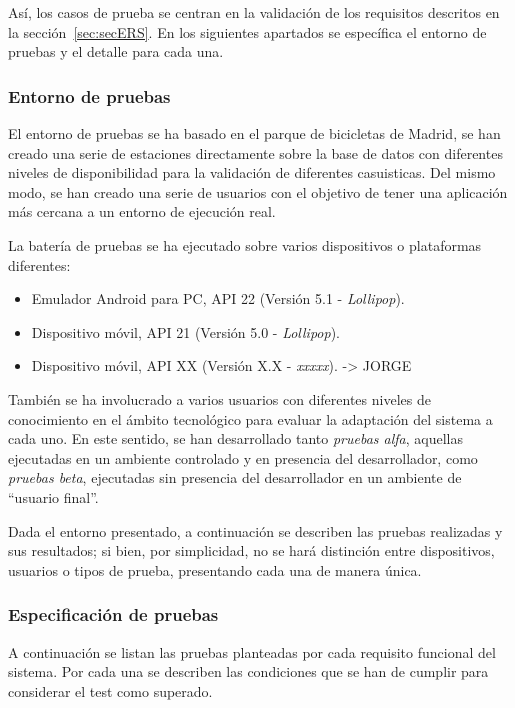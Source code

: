 Así, los casos de prueba se centran en la validación de los requisitos descritos en la sección~\ref{sec:secERS}. En los siguientes apartados se específica el entorno de pruebas y el detalle para cada una.

\subsubsection{Entorno de pruebas}

El entorno de pruebas se ha basado en el parque de bicicletas de Madrid, se han creado una serie de estaciones directamente sobre la base de datos con diferentes niveles de disponibilidad para la validación de diferentes casuisticas. Del mismo modo, se han creado una serie de usuarios con el objetivo de tener una aplicación más cercana a un entorno de ejecución real.

La batería de pruebas se ha ejecutado sobre varios dispositivos o plataformas diferentes:

\begin{itemize}
	\item Emulador Android para PC, API 22 (Versión 5.1 - \textit{Lollipop}).
	\item Dispositivo móvil, API 21 (Versión 5.0 - \textit{Lollipop}).
	\item Dispositivo móvil, API XX (Versión X.X - \textit{xxxxx}). -> JORGE
\end{itemize}

También se ha involucrado a varios usuarios con diferentes niveles de conocimiento en el ámbito tecnológico para evaluar la adaptación del sistema a cada uno. En este sentido, se han desarrollado tanto \emph{pruebas alfa}, aquellas ejecutadas en un ambiente controlado y en presencia del desarrollador, como \emph{pruebas beta}, ejecutadas sin presencia del desarrollador en un ambiente de ``usuario final''.

Dada el entorno presentado, a continuación se describen las pruebas realizadas y sus resultados; si bien, por simplicidad, no se hará distinción entre dispositivos, usuarios o tipos de prueba, presentando cada una de manera única.

\subsubsection{Especificación de pruebas}

A continuación se listan las pruebas planteadas por cada requisito funcional del sistema. Por cada una se describen las condiciones que se han de cumplir para considerar el test como superado.

